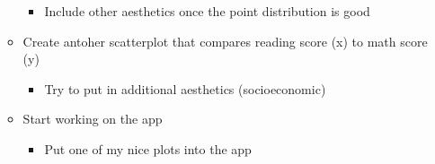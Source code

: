 \documentclass[
  letterpaper,
  DIV=11,
  numbers=noendperiod]{scrartcl}
\providecommand{\tightlist}{%
  \setlength{\itemsep}{0pt}\setlength{\parskip}{0pt}}\usepackage{longtable,booktabs,array}
\begin{document}
\begin{itemize}
\begin{itemize}
    \begin{itemize}
    \tightlist
    \item
      Include other aesthetics once the point distribution is good
    \end{itemize}
  \item
    Create antoher scatterplot that compares reading score (x) to math
    score (y)

    \begin{itemize}
    \tightlist
    \item
      Try to put in additional aesthetics (socioeconomic)
    \end{itemize}
  \item
    Start working on the app

    \begin{itemize}
    \tightlist
    \item
      Put one of my nice plots into the app
    \end{itemize}
  \end{itemize}
\end{itemize}
\end{document}
